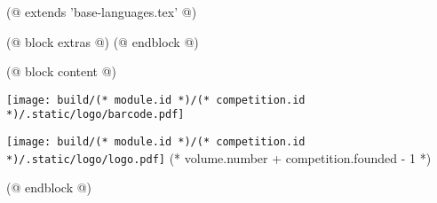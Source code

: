 (@ extends 'base-languages.tex' @)

(@ block extras @)
(@ endblock @)

(@ block content @)
    \pagestyle{empty}
    \begin{center}
        \null
        \vfill
        \texttt{[image: build/(* module.id *)/(* competition.id *)/.static/logo/barcode.pdf]}
    \end{center}
    \newpage
    \begin{center}
        \vspace*{20mm}
        \texttt{[image: build/(* module.id *)/(* competition.id *)/.static/logo/logo.pdf]}
        \vfill
        \fontsize{60}{25}\selectfont
        (* volume.number + competition.founded - 1 *)
    \end{center}
(@ endblock @)

